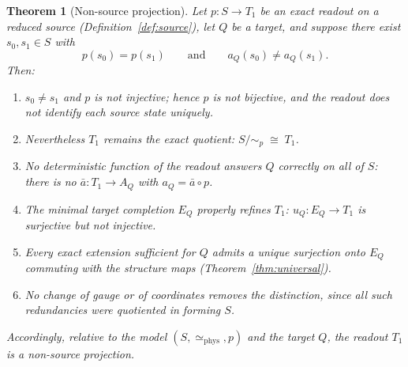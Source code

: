 \documentclass[11pt,reqno]{amsart}
\theoremstyle{plain}
\newtheorem{theorem}{Theorem}[section]
\theoremstyle{definition}
\theoremstyle{remark}
\begin{document}
\begin{theorem}[Non-source projection]\label{thm:nonsource}
Let $p\colon S\to T_1$ be an exact readout on a reduced source (Definition~\ref{def:source}), let $Q$ be a target, and suppose there exist $s_0,s_1\in S$ with
\begin{equation}\label{eq:witness}
p(s_0)=p(s_1)\qquad\text{and}\qquad a_Q(s_0)\neq a_Q(s_1).
\end{equation}
Then:
\begin{enumerate}
\item[(N1)] $s_0\neq s_1$ and $p$ is not injective; hence $p$ is not bijective, and the readout does not identify each source state uniquely.
\item[(N2)] Nevertheless $T_1$ remains the \emph{exact} quotient: $S/\!\sim_p\;\cong\;T_1$.
\item[(N3)] No deterministic function of the readout answers $Q$ correctly on all of $S$: there is \emph{no} $\bar a\colon T_1\to A_Q$ with $a_Q=\bar a\circ p$.
\item[(N4)] The minimal target completion $E_Q$ properly refines $T_1$: $u_Q\colon E_Q\to T_1$ is surjective but not injective.
\item[(N5)] Every exact extension sufficient for $Q$ admits a unique surjection onto $E_Q$ commuting with the structure maps (Theorem~\ref{thm:universal}).
\item[(N6)] No change of gauge or of coordinates removes the distinction, since all such redundancies were quotiented in forming $S$.
\end{enumerate}
Accordingly, \emph{relative to the model $(S,\simeq_{\mathrm{phys}},p)$ and the target $Q$}, the readout $T_1$ is a \emph{non-source projection}.
\end{theorem}
\end{document}
